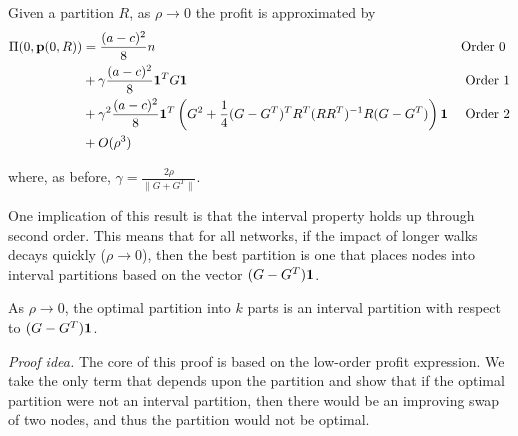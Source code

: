 \begin{theorem}
    Given a partition $R$, as $\rho \to 0$ the profit is approximated by
    \begin{align*}
        \Pi(0, \mathbf{p}(0,R)) &= \frac{(a-c)^2}{8} n & \text{Order 0 }\\
        &+ \gamma \frac{(a-c)^2}{8} \mathbf{1}^T G \mathbf{1} & \text{Order 1}\\
        &+ \gamma^2 \frac{(a-c)^2}{8} \mathbf{1}^T \left( G^2 + \frac{1}{4} (G-G^T)^T R^T(RR^T)^{-1} R (G-G^T) \right) \mathbf{1} & \text{Order 2} \\
        &+ O(\rho^3) \\
    \end{align*}

        where, as before, $\gamma = \frac{2\rho}{\|G+G^T\|}$.

\end{theorem}

One implication of this result is that the interval property holds up through second order. This means that for all networks, if the impact of longer walks decays quickly ($\rho \to 0$), then the best partition is one that places nodes into interval partitions based on the vector $(G-G^T)\mathbf{1}$. 

\begin{theorem}
    As $\rho\to 0 $, the optimal partition into $k$ parts is an interval partition with respect to $(G-G^T)\mathbf{1}$.
\end{theorem}
\textit{Proof idea.} The core of this proof is based on the low-order profit expression. We take the only term that depends upon the partition and show that if the optimal partition were not an interval partition, then there would be an improving swap of two nodes, and thus the partition would not be optimal.



